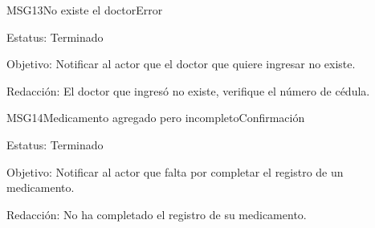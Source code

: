 \begin{mensaje}{MSG13}{No existe el doctor}{Error}
	\item[Estatus:] Terminado
	\item[Objetivo:] Notificar al actor que el doctor que quiere ingresar no existe.
	\item[Redacción:] El doctor que ingresó no existe, verifique el número de cédula.
\end{mensaje}

\begin{mensaje}{MSG14}{Medicamento agregado pero incompleto}{Confirmación}
	\item[Estatus:] Terminado
	\item[Objetivo:] Notificar al actor que falta por completar el registro de un medicamento.
	\item[Redacción:] No ha completado el registro de su medicamento.
\end{mensaje}

